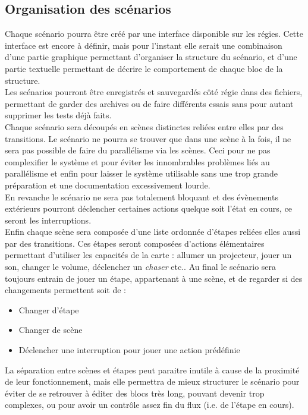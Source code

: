 \subsection{Organisation des scénarios}
Chaque scénario pourra être créé par une interface disponible sur les régies. Cette interface est encore à définir, mais pour l'instant elle serait une combinaison d'une partie graphique permettant d'organiser la structure du scénario, et d'une partie textuelle permettant de décrire le comportement de chaque bloc de la structure.\\
Les scénarios pourront être enregistrés et sauvegardés côté régie dans des fichiers, permettant de garder des archives ou de faire différents essais sans pour autant supprimer les tests déjà faits.\\
Chaque scénario sera découpés en scènes distinctes reliées entre elles par des transitions. \p
Le scénario ne pourra se trouver que dans une scène à la fois, il ne sera pas possible de faire du parallélisme via les scènes. Ceci pour ne pas complexifier le système et pour éviter les innombrables problèmes liés au parallélisme et enfin pour laisser le système utilisable sans une trop grande préparation et une documentation excessivement lourde.\\
En revanche le scénario ne sera pas totalement bloquant et des évènements extérieurs pourront déclencher certaines actions quelque soit l'état en cours, ce seront les interruptions.\\
Enfin chaque scène sera composée d'une liste ordonnée d'étapes reliées elles aussi par des transitions. Ces étapes seront composées d'actions élémentaires permettant d'utiliser les capacités de la carte : allumer un projecteur, jouer un son, changer le volume, déclencher un \textit{chaser} etc..\p
Au final le scénario sera toujours entrain de jouer un étape, appartenant à une scène, et de regarder si des changements permettent soit de :
\begin{itemize}
\item Changer d'étape
\item Changer de scène
\item Déclencher une interruption pour jouer une action prédéfinie
\end{itemize}
La séparation entre scènes et étapes peut paraitre inutile à cause de la proximité de leur fonctionnement, mais elle permettra de mieux structurer le scénario pour éviter de se retrouver à éditer des blocs très long, pouvant devenir trop complexes, ou pour avoir un contrôle assez fin du flux (i.e. de l'étape en cours).

